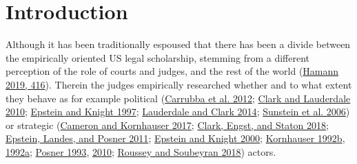\documentclass[
  11pt,
]{article}
\begin{document}
\vskip -8.5pt

{
\hypersetup{linkcolor=black}
\setcounter{tocdepth}{2}
\tableofcontents
}


{
\setcounter{tocdepth}{2}
\tableofcontents
}

\setlength{\parindent}{16pt}
\setlength{\parskip}{0pt}

\hypertarget{introduction}{%
\section{Introduction}\label{introduction}}

Although it has been traditionally espoused that there has been a divide
between the empirically oriented US legal scholarship, stemming from a
different perception of the role of courts and judges, and the rest of
the world (\protect\hyperlink{ref-hamannGermanFederalCourts2019}{Hamann
2019, 416}). Therein the judges empirically researched whether and to
what extent they behave as for example political
(\protect\hyperlink{ref-carrubbaWhoControlsContent2012}{Carrubba et al.
2012}; \protect\hyperlink{ref-clarkLocatingSupremeCourt2010}{Clark and
Lauderdale 2010};
\protect\hyperlink{ref-epsteinChoicesJusticesMake1997}{Epstein and
Knight 1997};
\protect\hyperlink{ref-lauderdaleScalingPoliticallyMeaningful2014}{Lauderdale
and Clark 2014};
\protect\hyperlink{ref-sunsteinAreJudgesPolitical2006}{Sunstein et al.
2006}) or strategic
(\protect\hyperlink{ref-cameronChapterWhatJudges2017}{Cameron and
Kornhauser 2017};
\protect\hyperlink{ref-clarkEstimatingEffectLeisure2018}{Clark, Engst,
and Staton 2018};
\protect\hyperlink{ref-epsteinWhyWhenJudges2011}{Epstein, Landes, and
Posner 2011};
\protect\hyperlink{ref-epsteinStrategicRevolutionJudicial2000}{Epstein
and Knight 2000};
\protect\hyperlink{ref-kornhauserModelingCollegialCourts1992}{Kornhauser
1992b},
\protect\hyperlink{ref-kornhauserModelingCollegialCourts1992a}{1992a};
\protect\hyperlink{ref-posnerWhatJudgesJustices1993}{Posner 1993},
\protect\hyperlink{ref-posnerHowJudgesThink2010}{2010};
\protect\hyperlink{ref-rousseyOverburdenedJudges2018}{Roussey and
Soubeyran 2018}) actors.
\end{document}
